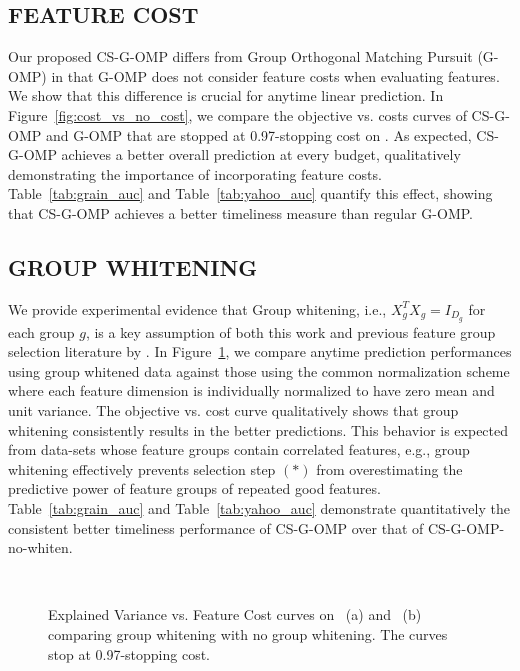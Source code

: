 \subsection{FEATURE COST}
Our proposed CS-G-OMP differs from Group Orthogonal Matching Pursuit (G-OMP) \citep{gomp} in that G-OMP does not consider feature costs when evaluating features. We show that this difference is crucial for anytime linear prediction. In Figure~\ref{fig:cost_vs_no_cost}, we compare the objective vs. costs curves of CS-G-OMP and G-OMP that are stopped at 0.97-stopping cost on \YahooLTR. As expected, CS-G-OMP achieves a
better overall prediction at every budget, qualitatively demonstrating the importance of incorporating feature costs. Table~\ref{tab:grain_auc} and Table~\ref{tab:yahoo_auc} 
quantify this effect, showing that CS-G-OMP 
achieves a better timeliness
measure than regular G-OMP. 

\subsection{GROUP WHITENING}
We provide experimental evidence that  
Group whitening, i.e., $X_g^TX_g = I_{D_g}$ for each group $g$, is a key assumption of both this work and previous feature group selection literature  by \cite{gomp, log_gomp}.
In Figure~\ref{fig:whiten_vs_no_whiten}, we compare 
anytime prediction performances using group whitened data 
against those using the common  
normalization scheme where each feature dimension
is individually normalized to have zero mean and unit variance. 
The objective vs. cost curve qualitatively shows that group whitening consistently results in the better predictions.
This behavior is expected from data-sets whose feature groups contain correlated features, e.g., group whitening effectively prevents selection step $(*)$ from overestimating the predictive power of feature groups of repeated good features. Table~\ref{tab:grain_auc} and Table~\ref{tab:yahoo_auc} demonstrate quantitatively the consistent better timeliness performance of CS-G-OMP over that of CS-G-OMP-no-whiten. 


\begin{figure}
\centering
{}
~
\caption{Explained Variance vs. Feature Cost curves on \Grain\, (a) and \YahooLTR\, (b)  comparing group whitening with no group whitening. The curves stop at 0.97-stopping cost.}
\label{fig:whiten_vs_no_whiten}
\end{figure}



